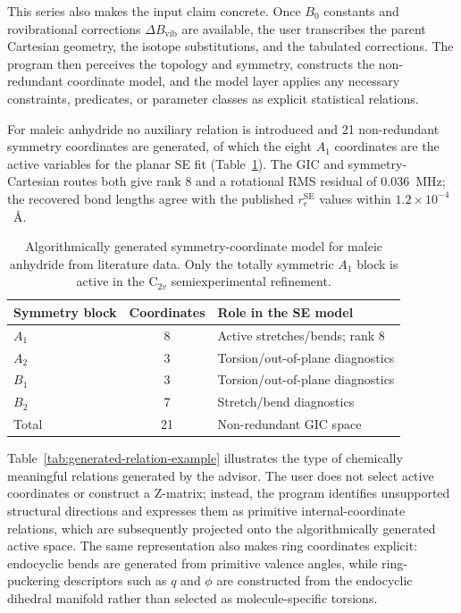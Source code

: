 \documentclass[aip,jcp,reprint,longbibliography,floatfix]{revtex4-2}
\begin{document}
This series also makes the input claim concrete. Once $B_0$ constants and
rovibrational corrections $\Delta B_\mathrm{vib}$ are available, the
user transcribes the parent Cartesian geometry, the isotope
substitutions, and the tabulated corrections. The program then perceives the
topology and symmetry, constructs the non-redundant coordinate model, and
the model layer applies any necessary constraints, predicates, or parameter
classes as explicit statistical relations.

For maleic anhydride no auxiliary relation is introduced and 21
non-redundant symmetry coordinates are generated, of which the eight $A_1$ coordinates are
the active variables for the planar SE fit (Table~\ref{tab:maleic-symmetry-gics}).
The GIC and symmetry-Cartesian routes both give rank 8 and a rotational RMS
residual of 0.036~MHz; the recovered bond lengths agree with the published
$r_e^\mathrm{SE}$ values within $1.2\times10^{-4}$~\AA.

\begin{table}[t]
\caption{Algorithmically generated symmetry-coordinate model for maleic
anhydride from literature data. Only the totally symmetric $A_1$ block is
active in the C$_{2v}$ semiexperimental refinement.}
\label{tab:maleic-symmetry-gics}
\scriptsize
\setlength{\tabcolsep}{4pt}
\begin{tabular}{@{}lcl@{}}
\toprule
Symmetry block & Coordinates & Role in the SE model \\
\midrule
$A_1$ & 8 & Active stretches/bends; rank 8 \\
$A_2$ & 3 & Torsion/out-of-plane diagnostics \\
$B_1$ & 3 & Torsion/out-of-plane diagnostics \\
$B_2$ & 7 & Stretch/bend diagnostics \\
\midrule
Total & 21 & Non-redundant GIC space \\
\bottomrule
\end{tabular}
\end{table}

Table~\ref{tab:generated-relation-example} illustrates the type of chemically
meaningful relations generated by the advisor. The user does
not select active coordinates or construct a Z-matrix; instead, the program
identifies unsupported structural directions and expresses them as primitive
internal-coordinate relations, which are subsequently projected onto the
algorithmically generated active space. The same representation also makes
ring coordinates explicit: endocyclic bends are generated from primitive
valence angles, while ring-puckering descriptors such as $q$ and $\phi$ are
constructed from the endocyclic dihedral manifold rather than selected as
molecule-specific torsions.
\end{document}
